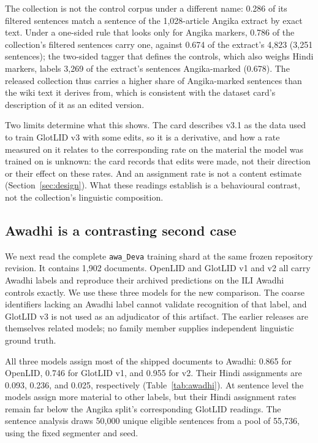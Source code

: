 \documentclass[final]{clv2025}
\newcommand{\lab}[1]{\texttt{#1}}
\begin{document}
The collection is not the control corpus under a different name: 0.286 of its filtered sentences match a sentence of the 1{,}028-article Angika extract by exact text. Under a one-sided rule that looks only for Angika markers, 0.786 of the collection's filtered sentences carry one, against 0.674 of the extract's 4{,}823 (3{,}251 sentences); the two-sided tagger that defines the controls, which also weighs Hindi markers, labels 3{,}269 of the extract's sentences Angika-marked (0.678). The released collection thus carries a higher share of Angika-marked sentences than the wiki text it derives from, which is consistent with the dataset card's description of it as an edited version.

Two limits determine what this shows. The card describes v3.1 as the data used to train GlotLID v3 with some edits, so it is a derivative, and how a rate measured on it relates to the corresponding rate on the material the model was trained on is unknown: the card records that edits were made, not their direction or their effect on these rates. And an assignment rate is not a content estimate (Section~\ref{sec:design}). What these readings establish is a behavioural contrast, not the collection's linguistic composition.

\subsection{Awadhi is a contrasting second case}\label{sec:awadhi}

We next read the complete \lab{awa\_Deva} training shard at the same frozen repository revision. It contains 1,902 documents. OpenLID and GlotLID v1 and v2 all carry Awadhi labels and reproduce their archived predictions on the ILI Awadhi controls exactly. We use these three models for the new comparison. The coarse identifiers lacking an Awadhi label cannot validate recognition of that label, and GlotLID v3 is not used as an adjudicator of this artifact. The earlier releases are themselves related models; no family member supplies independent linguistic ground truth.

All three models assign most of the shipped documents to Awadhi: 0.865 for OpenLID, 0.746 for GlotLID v1, and 0.955 for v2. Their Hindi assignments are 0.093, 0.236, and 0.025, respectively (Table~\ref{tab:awadhi}). At sentence level the models assign more material to other labels, but their Hindi assignment rates remain far below the Angika split's corresponding GlotLID readings. The sentence analysis draws 50,000 unique eligible sentences from a pool of 55,736, using the fixed segmenter and seed.
\end{document}
